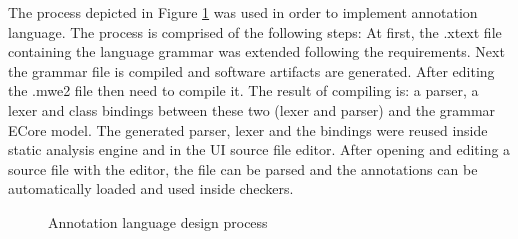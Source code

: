 The process depicted in Figure \ref{figure:Language_Design_Process} was used in order to
implement annotation language. The process is
comprised of the following steps: At first, the .xtext file
containing the language grammar was extended following the requirements. Next the grammar file is compiled and software artifacts are generated. After editing the .mwe2 file then need to compile it. The result of compiling is: a parser, a lexer and class bindings between these two (lexer and parser) and the grammar ECore model. The generated parser, lexer and the bindings were reused inside static analysis engine and in the UI source file editor. After opening and editing a source file with the editor, the file can be parsed and the annotations can be automatically loaded and used inside checkers.
\begin{figure}[htbp]
	\centering
	\vspace{-2em}
	\caption{Annotation language design process}
	\label{figure:Language_Design_Process}
\end{figure}